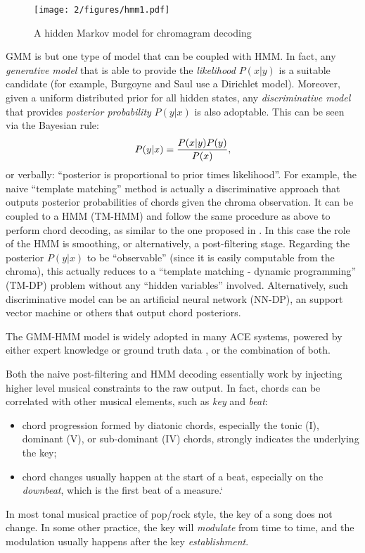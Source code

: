 \begin{figure}[htb]
\centering
\texttt{[image: 2/figures/hmm1.pdf]}
\caption{A hidden Markov model for chromagram decoding}
\label{fig:2-hmm1}
\end{figure}

GMM is but one type of model that can be coupled with HMM. In fact, any {\it generative model} that is able to provide the {\it likelihood} $P(x|y)$ is a suitable candidate (for example, Burgoyne and Saul \cite{burgoyne2005learning} use a Dirichlet model). Moreover, given a uniform distributed prior for all hidden states, any {\it discriminative model} that provides {\it posterior probability} $P(y|x)$ is also adoptable. This can be seen via the Bayesian rule:
\begin{equation}
P(y|x) = {P(x|y)P(y) \over P(x)},
\end{equation}
or verbally: ``posterior is proportional to prior times likelihood''. For example, the naive ``template matching'' method is actually a discriminative approach that outputs posterior probabilities of chords given the chroma observation. It can be coupled to a HMM (TM-HMM) and follow the same procedure as above to perform chord decoding, as similar to the one proposed in \cite{ryynanen2008automatic}. In this case the role of the HMM is smoothing, or alternatively, a post-filtering stage. Regarding the posterior $P(y|x)$ to be ``observable'' (since it is easily computable from the chroma), this actually reduces to a ``template matching - dynamic programming'' (TM-DP) problem without any ``hidden variables'' involved. Alternatively, such discriminative model can be an artificial neural network \cite{zhang2008chord} (NN-DP), an support vector machine \cite{weller2009structured} or others that output chord posteriors.

The GMM-HMM model is widely adopted in many ACE systems, powered by either expert knowledge \cite{bello2005robust,weil2008hmm,cannam2013mirex} or ground truth data \cite{ellis20072007,lee2008acoustic,weil2009automatic,khadkevich2009use,mauch2008discrete,reed2009minimum,cho2009real}, or the combination of both.

Both the naive post-filtering and HMM decoding essentially work by injecting higher level musical constraints to the raw output. In fact, chords can be correlated with other musical elements, such as {\it key} and {\it beat}:
\begin{itemize}
\item chord progression formed by diatonic chords, especially the tonic (I), dominant (V), or sub-dominant (IV) chords, strongly indicates the underlying the key;
\item chord changes usually happen at the start of a beat, especially on the {\it downbeat}, which is the first beat of a measure.`
\end{itemize}
In most tonal musical practice of pop/rock style, the key of a song does not change. In some other practice, the key will {\it modulate} from time to time, and the modulation usually happens after the key {\it establishment}.

